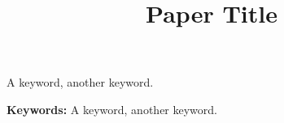 \documentclass[conference,compsoc]{IEEEtran}
\begin{document}
\title{Paper Title}
\date{}
\ifanonymous
\else
    \ifieee
        
    \else\ifiacr
        
    \else\ifccs
        
    \else
        
    \fi\fi\fi
\fi

\ifccs\else\maketitle\fi
\begin{abstract}
    

    \ifiacr
    \fi
\end{abstract}

\ifieee
    \begin{IEEEkeywords}
    A keyword, another keyword.
    \end{IEEEkeywords}

    \IEEEpeerreviewmaketitle
\else\ifccs
    \maketitle
\else\ifiacr
\else
    \noindent \textbf{Keywords:} A keyword, another keyword.
\fi\fi\fi


% 
% 

\ifieee
    
    
\else\ifccs
    
    
\else
    {\small
    
    
    }
\fi\fi

\ifccs
    \begin{appendix}
\else
    \appendix
\fi



\ifccs\end{appendix}\fi
\end{document}
